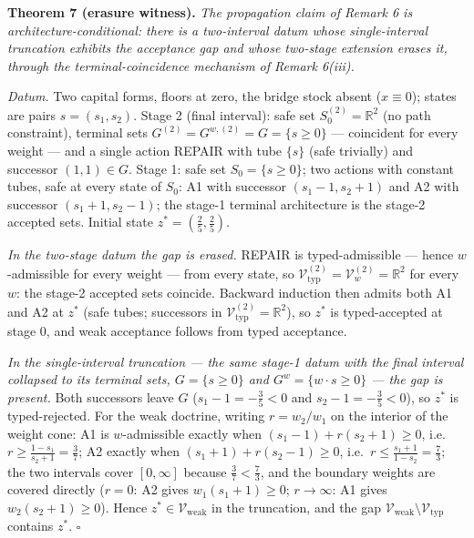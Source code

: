 \documentclass[11pt]{article}
\begin{document}
\textbf{Theorem 7 (erasure witness).} \emph{The propagation claim of
Remark 6 is architecture-conditional: there is a two-interval datum
whose single-interval truncation exhibits the acceptance gap and whose
two-stage extension erases it, through the terminal-coincidence
mechanism of Remark 6(iii).}

\emph{Datum.} Two capital forms, floors at zero, the bridge stock absent
(\(x \equiv 0\)); states are pairs \(s = (s_1, s_2)\). Stage 2 (final
interval): safe set \(S_0^{(2)} = \mathbb{R}^2\) (no path constraint),
terminal sets \(G^{(2)} = G^{w,(2)} = G = \{ s \ge 0 \}\) --- coincident
for every weight --- and a single action REPAIR with tube \(\{s\}\)
(safe trivially) and successor \((1, 1) \in G\). Stage 1: safe set
\(S_0 = \{ s \ge 0 \}\); two actions with constant tubes, safe at every
state of \(S_0\): A1 with successor \((s_1 - 1, s_2 + 1)\) and A2 with
successor \((s_1 + 1, s_2 - 1)\); the stage-1 terminal architecture is
the stage-2 accepted sets. Initial state \(z^* = (\tfrac25, \tfrac25)\).

\emph{In the two-stage datum the gap is erased.} REPAIR is
typed-admissible --- hence \(w\)-admissible for every weight --- from
every state, so
\(\mathcal{V}_{\mathrm{typ}}^{(2)} = \mathcal{V}_w^{(2)} = \mathbb{R}^2\)
for every \(w\): the stage-2 accepted sets coincide. Backward induction
then admits both A1 and A2 at \(z^*\) (safe tubes; successors in
\(\mathcal{V}_{\mathrm{typ}}^{(2)} = \mathbb{R}^2\)), so \(z^*\) is
typed-accepted at stage 0, and weak acceptance follows from typed
acceptance.

\emph{In the single-interval truncation --- the same stage-1 datum with
the final interval collapsed to its terminal sets, \(G = \{s \ge 0\}\)
and \(G^w = \{w \cdot s \ge 0\}\) --- the gap is present.} Both
successors leave \(G\) (\(s_1 - 1 = -\tfrac35 < 0\) and
\(s_2 - 1 = -\tfrac35 < 0\)), so \(z^*\) is typed-rejected. For the weak
doctrine, writing \(r = w_2 / w_1\) on the interior of the weight cone:
A1 is \(w\)-admissible exactly when \((s_1 - 1) + r (s_2 + 1) \ge 0\),
i.e.~\(r \ge \tfrac{1 - s_1}{s_2 + 1} = \tfrac37\); A2 exactly when
\((s_1 + 1) + r (s_2 - 1) \ge 0\),
i.e.~\(r \le \tfrac{s_1 + 1}{1 - s_2} = \tfrac73\); the two intervals
cover \([0, \infty]\) because \(\tfrac37 < \tfrac73\), and the boundary
weights are covered directly (\(r = 0\): A2 gives
\(w_1(s_1 + 1) \ge 0\); \(r \to \infty\): A1 gives
\(w_2(s_2 + 1) \ge 0\)). Hence \(z^* \in \mathcal{V}_{\mathrm{weak}}\)
in the truncation, and the gap
\(\mathcal{V}_{\mathrm{weak}} \setminus \mathcal{V}_{\mathrm{typ}}\)
contains \(z^*\). \ensuremath{\square}
\end{document}
